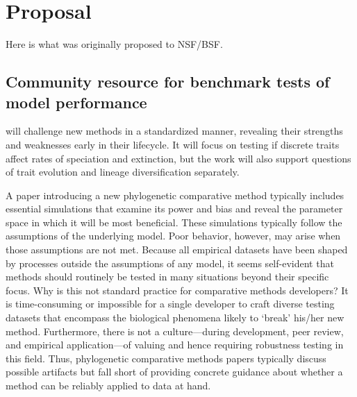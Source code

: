 \section{Proposal}

Here is what was originally proposed to NSF/BSF.

\subsection{Community resource for benchmark tests of model performance}

\phycomb will challenge new methods in a standardized manner, revealing their strengths and weaknesses early in their lifecycle.
It will focus on testing if discrete traits affect rates of speciation and extinction, but the work will also support questions of trait evolution and lineage diversification separately.

A paper introducing a new phylogenetic comparative method typically includes 
essential simulations that examine its power and bias and reveal the parameter space in which it will be most beneficial.
These simulations typically follow the assumptions of the underlying model.
Poor behavior, however, may arise when those assumptions are not met.
Because all empirical datasets have been shaped by processes outside the assumptions of any model, it seems self-evident that methods should routinely be tested in many situations beyond their specific focus.
Why is this not standard practice for comparative methods developers?
It is time-consuming or impossible for a single developer to craft diverse testing datasets that encompass the biological phenomena likely to `break' his/her new method.
Furthermore, there is not a culture---during development, peer review, and empirical application---of valuing and hence requiring robustness testing in this field.
Thus, phylogenetic comparative methods papers typically discuss possible artifacts but fall short of providing concrete guidance about whether a method can be reliably applied to data at hand. 

